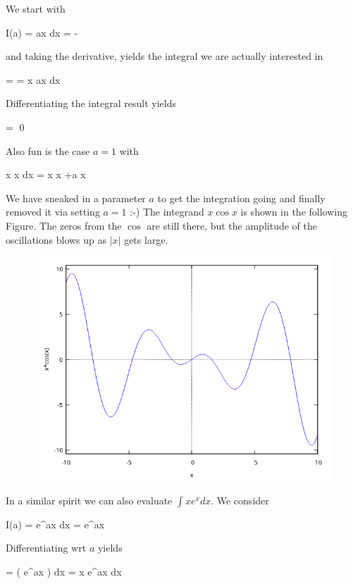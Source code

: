 We start with 

\bee
I(a) = \int \sin ax dx = - 
\eee

and taking the derivative, yields the integral we are actually interested in

\bee
{} = \int {} = \int x \cos ax dx
\eee

Differentiating the integral result yields

\bee
{} =  \qed
\eee


Also fun is the case $a=1$ with

\bee
\int x \cos x dx = x \sin x +\cos a x
\eee

We have sneaked in a parameter $a$ to get the integration going and finally removed it via setting $a=1$ :-) The integrand $x \cos x$ is shown in the following Figure. The zeros from the $\cos$ are still there, but the amplitude of the oscillations blows up as $| x |$ gets large.

\begin{figure}[H]
\includegraphics[scale=0.7]{images/2022-03-21_plot_1.png}
\end{figure}

In a similar spirit we can also evaluate $\int x e^x dx$. We consider

\bee
I(a) = \int e^{ax} dx =  e^{ax}
\eee

Differentiating wrt $a$ yields

\bee
{} = \int \left(  e^{ax} \right) dx = \int x e^{ax} dx
\eee

